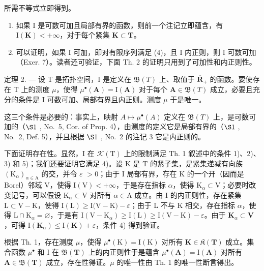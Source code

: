 所需不等式立即得到。

\begin{enumerate}
\def\labelenumi{\arabic{enumi})}
\setcounter{enumi}{3}
\item
  如果 I 是可数可加且局部有界的函数，则前一个注记立即蕴含，有 \(\mathrm{I}(\mathbf{K}) < +\infty\)，对于每个紧集 \(\mathbf{K} \subset \mathbf{T}\)。
\item
  可以证明，如果 I 可加，即对有限序列满足 (4)，且 I 内正则，则 I 可数可加（Exer. 7）。读者还可验证，下面 Th. 2 的证明只用到了可加性和内正则性。
\end{enumerate}

定理 2. --- 设 T 是拓扑空间，I 是定义在 \(\mathfrak{B}(T)\) 上、取值于 \(\overline{\mathbf{R}}_{+}\) 的函数。要使存在 T 上的测度 \(\mu\)，使得 \(\mu^{\bullet}(\mathbf{A}) = \mathrm{I}(\mathbf{A})\) 对于每个 \(\mathbf{A} \in \mathfrak{B}(T)\) 成立，必要且充分的条件是 I 可数可加、局部有界且内正则。测度 \(\mu\) 于是唯一。

这三个条件是必要的：事实上，映射 \(A \mapsto \mu^{\bullet}(A)\) 定义在 \(\mathfrak{B}(T)\) 上，是可数可加的（\(\S1\) , No.~5, Cor. of Prop. 4），由测度的定义它是局部有界的（\(\S1\) , No.~2, Def. 5），并且根据 \(\S1\) , No.~2 的注记 3 它是内正则的。

下面证明存在性。显然，I 在 \(\mathcal{K}(\mathrm{T})\) 上的限制满足 Th. 1 叙述中的条件 1)、2)、3) 和 5)；我们还要证明它满足 4)。设 K 是 T 的紧子集，是紧集递减有向族 \((\mathrm{K}_{\alpha})_{\alpha \in \mathrm{A}}\) 的交，并令 \(\varepsilon\) \(>0\)；由于 I 局部有界，存在 K 的一个开（因而是 Borel）邻域 V，使得 \(\mathrm{I(V)} < +\infty\)，于是存在指标 \(\alpha\)，使得 \(\mathrm{K}_{\alpha} \subset \mathrm{V}\)；必要时改变记号，可以假设 \(\mathrm{K}_{\alpha} \subset \mathrm{V}\) 对所有 \(\alpha \in \mathrm{A}\) 成立。由 I 的内正则性，存在紧集 \(\mathrm{L} \subset \mathrm{V} - \mathrm{K}\)，使得 \(\mathrm{I(L)} \geqslant \mathrm{I(V} - \mathrm{K)} - \varepsilon\)；由于 L 不与 K 相交，存在指标 \(\alpha\)，使得 \(\mathrm{L} \cap \mathrm{K}_{\alpha} = \varnothing\)，于是有 \(\mathrm{I}(\mathrm{V} - \mathrm{K}_{\alpha}) \geqslant \mathrm{I}(\mathrm{L}) \geqslant \mathrm{I}(\mathrm{V} - \mathrm{K}) - \varepsilon\)。由于 \(\mathbf{K}_{\alpha} \subset \mathbf{V}\)，可得 \(\mathrm{I}(\mathbf{K}_{\alpha}) \leqslant \mathrm{I}(\mathbf{K}) + \varepsilon\)，条件 4) 得到验证。

根据 Th. 1，存在测度 \(\mu\)，使得 \(\mu^{\bullet}(\mathrm{K}) = \mathrm{I}(\mathrm{K})\) 对所有 \(\mathbf{K} \in \mathfrak{K}(\mathbf{T})\) 成立。集合函数 \(\mu^{\bullet}\) 和 I 在 \(\mathfrak{B}(\mathbf{T})\) 上的内正则性于是蕴含 \(\mu^{\bullet}(\mathbf{A}) = \mathrm{I}(\mathbf{A})\) 对所有 \(\mathbf{A} \in \mathfrak{B}(\mathbf{T})\) 成立，存在性得证。\(\mu\) 的唯一性由 Th. 1 的唯一性断言得出。

